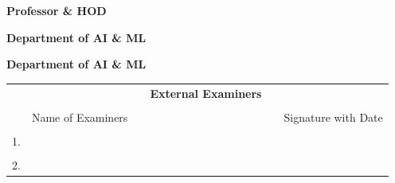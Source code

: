 

\vspace{1.5cm}

\begin{spacing}{0.4}
{\noindent\large\bfseries{\printGuideNameA}\unskip\strut}\hfill{\large\bfseries{\printHOD}\unskip\strut\par}
{\noindent\large\bfseries{\printGuideDesigA}\unskip\strut}\hfill{\large\bfseries{Professor \& HOD}\unskip\strut\par}
{\noindent\large\bfseries{Department of AI \& ML}\unskip\strut}\hfill{\large\bfseries{Department of AI \& ML}\unskip\strut\par}
\end{spacing}

\vspace{1.0cm}

\begin{table}[H]
\centering
\begin{tabular}{lccp{6cm}cc}
&&&\textbf{\Large External Examiners}&&\\
&&&&&\\
&Name of Examiners &&& & Signature with Date\\
&&&&&\\
1.&&&&&\\
&&&&&\\
2.&&&&&\\
\end{tabular}%
\end{table}

\newpage